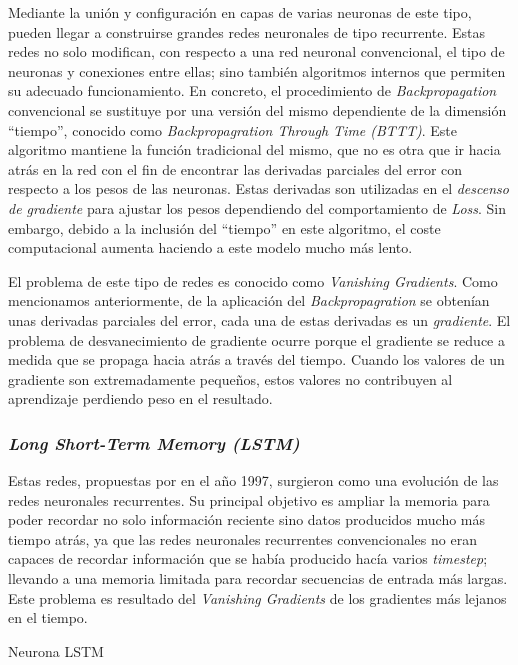 Mediante la unión y configuración en capas de varias neuronas de este tipo, pueden llegar a construirse grandes redes neuronales de tipo recurrente. Estas redes no solo modifican, con respecto a una red neuronal convencional, el tipo de neuronas y conexiones entre ellas; sino también algoritmos internos que permiten su adecuado funcionamiento. En concreto, el procedimiento de \textit{Backpropagation} convencional se sustituye por una versión del mismo dependiente de la dimensión ``tiempo'', conocido como \textit{Backpropagration Through Time (BTTT)}. Este algoritmo mantiene la función tradicional del mismo, que no es otra que ir hacia atrás en la red con el fin de encontrar las derivadas parciales del error con respecto a los pesos de las neuronas. Estas derivadas son utilizadas en el \textit{descenso de gradiente} para ajustar los pesos dependiendo del comportamiento de \textit{Loss}. Sin embargo, debido a la inclusión del ``tiempo'' en este algoritmo, el coste computacional aumenta haciendo a este modelo mucho más lento.

El problema de este tipo de redes es conocido como \textit{Vanishing Gradients}. Como mencionamos anteriormente, de la aplicación del \textit{Backpropagration} se obtenían unas derivadas parciales del error, cada una de estas derivadas es un \textit{gradiente}. El problema de desvanecimiento de gradiente ocurre porque el gradiente se reduce a medida que se propaga hacia atrás a través del tiempo. Cuando los valores de un gradiente son extremadamente pequeños, estos valores no contribuyen al aprendizaje perdiendo peso en el resultado. 

\subsubsection{\textit{Long Short-Term Memory (LSTM)}}
Estas redes, propuestas por \citep{lstm} en el año 1997, surgieron como una evolución de las redes neuronales recurrentes. Su principal objetivo es ampliar la memoria para poder recordar no solo información reciente sino datos producidos mucho más tiempo atrás, ya que las redes neuronales recurrentes convencionales no eran capaces de recordar información que se había producido hacía varios \textit{timestep}; llevando a una memoria limitada para recordar secuencias de entrada más largas. Este problema es resultado del \textit{Vanishing Gradients} de los gradientes más lejanos en el tiempo.

%
{Neurona LSTM}

